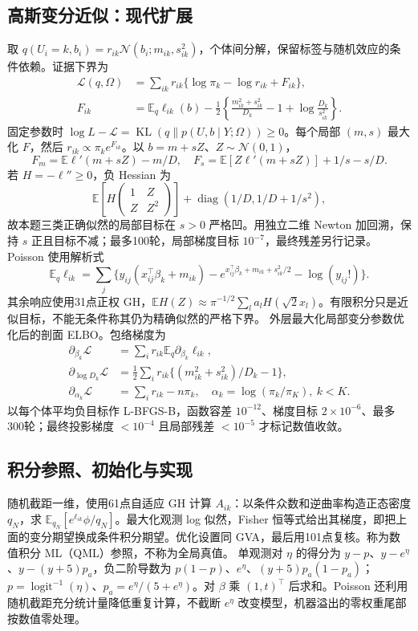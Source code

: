 \documentclass[UTF8,a4paper,11pt,fontset=fandol]{ctexart}
\newcommand{\E}{\mathbb E}\newcommand{\N}{\mathcal N}\newcommand{\KL}{\operatorname{KL}}
\begin{document}
\subsection{高斯变分近似：现代扩展}
取 $q(U_i=k,b_i)=r_{ik}\N(b_i;m_{ik},s_{ik}^2)$，个体间分解，保留标签与随机效应的条件依赖。证据下界为
\begin{align}
\mathcal L(q,\Omega)&=\sum_{ik}r_{ik}\{\log\pi_k-\log r_{ik}+F_{ik}\},\\
F_{ik}&=\E_q\ell_{ik}(b)-\frac12\left\{\frac{m_{ik}^2+s_{ik}^2}{D_k}-1+\log\frac{D_k}{s_{ik}^2}\right\}.
\end{align}
固定参数时 $\log L-\mathcal L=\KL(q\|p(U,b\mid Y;\Omega))\geq0$。每个局部 $(m,s)$ 最大化 $F$，然后 $r_{ik}\propto\pi_ke^{F_{ik}}$。以 $b=m+sZ$、$Z\sim\N(0,1)$，
\[
F_m=\E\ell'(m+sZ)-m/D,\quad F_s=\E[Z\ell'(m+sZ)]+1/s-s/D.
\]
若 $H=-\ell''\geq0$，负 Hessian 为
\[
\E\left[H\begin{pmatrix}1&Z\\Z&Z^2\end{pmatrix}\right]
+\operatorname{diag}(1/D,1/D+1/s^2),
\]
故本题三类正确似然的局部目标在 $s>0$ 严格凹。用独立二维 Newton 加回溯，保持 $s$ 正且目标不减；最多100轮，局部梯度目标 $10^{-7}$，最终残差另行记录。
Poisson 使用解析式
\[
\E_q\ell_{ik}=\sum_j\{y_{ij}(x_{ij}^\top\beta_k+m_{ik})
-e^{x_{ij}^\top\beta_k+m_{ik}+s_{ik}^2/2}-\log(y_{ij}!)\}.
\]
其余响应使用31点正权 GH，$\E H(Z)\approx\pi^{-1/2}\sum_l a_lH(\sqrt2x_l)$。有限积分只是近似目标，不能无条件称其仍为精确似然的严格下界。
外层最大化局部变分参数优化后的剖面 ELBO。包络梯度为
\begin{align}
\partial_{\beta_k}\mathcal L&=\sum_i r_{ik}\E_q\partial_{\beta_k}\ell_{ik},\\
\partial_{\log D_k}\mathcal L&=\tfrac12\sum_i r_{ik}\{(m_{ik}^2+s_{ik}^2)/D_k-1\},\\
\partial_{\alpha_k}\mathcal L&=\sum_i r_{ik}-n\pi_k,\quad \alpha_k=\log(\pi_k/\pi_K),\ k<K.
\end{align}
以每个体平均负目标作 L-BFGS-B，函数容差 $10^{-12}$、梯度目标 $2\times10^{-6}$、最多300轮；最终投影梯度 $<10^{-4}$ 且局部残差 $<10^{-5}$ 才标记数值收敛。

\subsection{积分参照、初始化与实现}
随机截距一维，使用61点自适应 GH 计算 $A_{ik}$：以条件众数和逆曲率构造正态密度 $q_N$，求 $\E_{q_N}[e^{\ell_{ik}}\phi/q_N]$。最大化观测 log 似然，Fisher 恒等式给出其梯度，即把上面的变分期望换成条件积分期望。优化设置同 GVA，最后用101点复核。称为数值积分 ML（QML）参照，不称为全局真值。
单观测对 $\eta$ 的得分为 $y-p$、$y-e^\eta$、$y-(y+5)p_a$，负二阶导数为 $p(1-p)$、$e^\eta$、$(y+5)p_a(1-p_a)$；$p=\operatorname{logit}^{-1}(\eta)$、$p_a=e^\eta/(5+e^\eta)$。对 $\beta$ 乘 $(1,t)^\top$ 后求和。Poisson 还利用随机截距充分统计量降低重复计算，不截断 $e^\eta$ 改变模型，机器溢出的零权重尾部按数值零处理。
\end{document}
